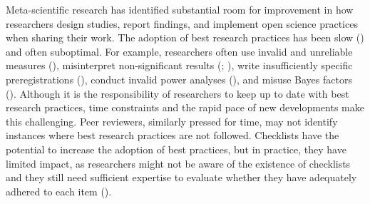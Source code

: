 \documentclass[
  letterpaper,
  12pt]{article}
\begin{document}
Meta-scientific research has identified substantial room for improvement
in how researchers design studies, report findings, and implement open
science practices when sharing their work. The adoption of best research
practices has been slow () and often suboptimal. For example, researchers often use invalid
and unreliable measures (), misinterpret non-significant results
(;
), write
insufficiently specific preregistrations
(), conduct
invalid power analyses (), and misuse Bayes factors
(). Although
it is the responsibility of researchers to keep up to date with best
research practices, time constraints and the rapid pace of new
developments make this challenging. Peer reviewers, similarly pressed
for time, may not identify instances where best research practices are
not followed. Checklists have the potential to increase the adoption of
best practices, but in practice, they have limited impact, as
researchers might not be aware of the existence of checklists and they
still need sufficient expertise to evaluate whether they have adequately
adhered to each item ().
\end{document}
